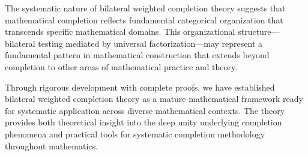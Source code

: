 \documentclass[11pt]{article}
\theoremstyle{plain}
\theoremstyle{definition}
\theoremstyle{remark}
\begin{document}
The systematic nature of bilateral weighted completion theory suggests that mathematical completion reflects fundamental categorical organization that transcends specific mathematical domains. This organizational structure—bilateral testing mediated by universal factorization—may represent a fundamental pattern in mathematical construction that extends beyond completion to other areas of mathematical practice and theory.

Through rigorous development with complete proofs, we have established bilateral weighted completion theory as a mature mathematical framework ready for systematic application across diverse mathematical contexts. The theory provides both theoretical insight into the deep unity underlying completion phenomena and practical tools for systematic completion methodology throughout mathematics.


\end{document}
